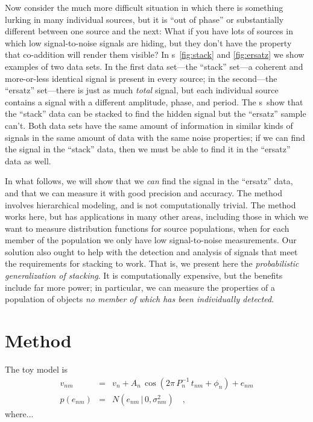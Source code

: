 \documentclass[12pt]{article}
\newcommand{\figurenames}{\figurename s}
\newcommand{\given}{\,|\,}
\newcommand{\amp}{A}
\newcommand{\period}{P}
\newcommand{\phase}{\phi}
\newcommand{\normal}{N}
\begin{document}
Now consider the much more difficult situation in which there is something lurking
in many individual sources, but it is ``out of phase'' or substantially different
between one source and the next:
What if you have lots of sources in which low signal-to-noise signals are hiding, but
they don't have the property that co-addition will render them visible?
In \figurenames~\ref{fig:stack} and \ref{fig:ersatz} we show examples of two data
sets.
In the first data set---the ``stack'' set---a coherent and more-or-less identical
signal is present in every source; in the second---the ``ersatz'' set---there is
just as much \emph{total} signal, but each individual source contains a signal with
a different amplitude, phase, and period.
The \figurenames\ show that the ``stack'' data can be stacked to find the hidden
signal but the ``ersatz'' sample can't.
Both data sets have the same amount of information in similar kinds of signals
in the same amount of data with the same noise properties; if we can find the signal
in the ``stack'' data, then we must be able to find it in the ``ersatz'' data as
well.

In what follows, we will show that we \emph{can} find the signal in the ``ersatz''
data, and that we can measure it with good precision and accuracy.
The method involves hierarchical modeling, and is not computationally trivial.
The method works here, but has applications in many other areas, including those
in which we want to measure distribution functions for source populations, when for
each member of the population we only have low signal-to-noise measurements.
Our solution also ought to help with the detection and analysis of signals that
meet the requirements for stacking to work.
That is, we present here the \emph{probabilistic generalization of stacking}.
It is computationally expensive, but the benefits include far more power;
in particular, we can measure the properties of a population of objects
\emph{no member of which has been individually detected}.

\section{Method}

The toy model is
\begin{eqnarray}
v_{nm}
  &=&
v_n + \amp_n\,\cos(2\pi\,\period_n^{-1}\,t_{nm} + \phase_n) + e_{nm}
\\
p(e_{nm})
  &=&
\normal(e_{nm}\given 0,\sigma_{nm}^2)
\quad,
\end{eqnarray}
where...
\end{document}
